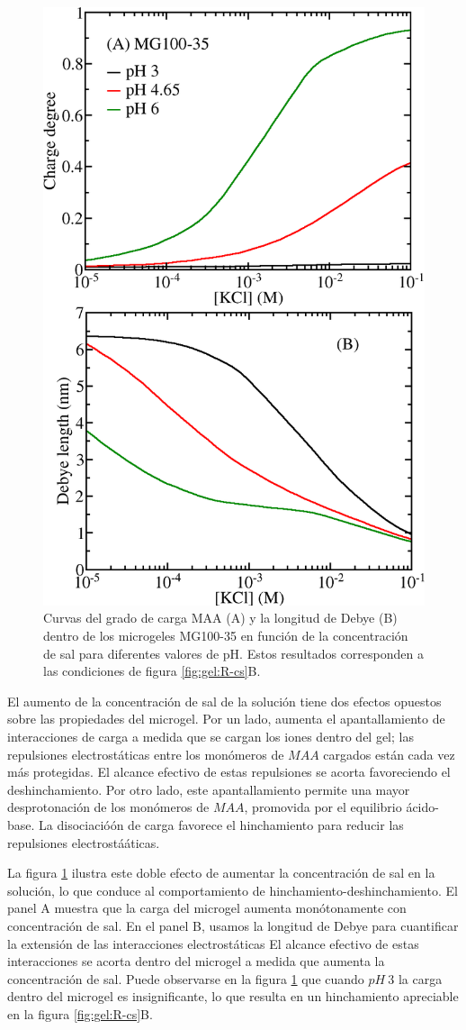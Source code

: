 \begin{figure}[!tb]
	\centering
	\includegraphics[width=0.5\linewidth]{Figures/graph-gel/f-cs.png}
	\caption{Curvas del grado de carga MAA (A) y la longitud de Debye (B) dentro de los microgeles MG100-35 en funci\'on de la concentraci\'on de sal para diferentes valores de pH.
		Estos resultados corresponden a las condiciones de figura \ref{fig:gel:R-cs}B.}
	\label{fig:gel:f-cs}
\end{figure}



El aumento de la concentraci\'on de sal de la soluci\'on tiene dos efectos opuestos sobre las propiedades del microgel.
Por un lado, aumenta el apantallamiento de interacciones de carga a medida que se cargan los iones dentro del gel; las repulsiones electrost\'aticas entre los mon\'omeros de $MAA$ cargados est\'an cada vez m\'as protegidas.
El alcance efectivo de estas repulsiones se acorta favoreciendo el deshinchamiento.
Por otro lado, este apantallamiento permite una mayor desprotonaci\'on de los mon\'omeros de $MAA$, promovida por el equilibrio \'acido-base.
La disociació\'on de carga favorece el hinchamiento para reducir las repulsiones electrostá\'aticas.


La figura \ref{fig:gel:f-cs} ilustra este doble efecto de aumentar la concentraci\'on de sal en la soluci\'on, lo que conduce al comportamiento de hinchamiento-deshinchamiento.
El panel A muestra que la carga del microgel aumenta mon\'otonamente con concentraci\'on de sal.
En el panel B, usamos la longitud de Debye para cuantificar la extensi\'on de las interacciones electrost\'aticas %
El alcance efectivo de estas interacciones se acorta dentro del microgel a medida que aumenta la concentraci\'on de sal.
Puede observarse en la figura \ref{fig:gel:f-cs} que cuando $pH~3$ la carga dentro del microgel es insignificante, lo que resulta en un hinchamiento apreciable en la figura \ref{fig:gel:R-cs}B.



